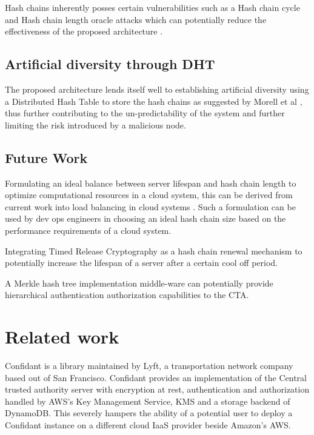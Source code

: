 \documentclass{sig-alternate-05-2015}
\begin{document}
Hash chains inherently posses certain vulnerabilities such as a Hash chain cycle and Hash chain length oracle attacks which can potentially reduce the effectiveness of the proposed architecture \cite{lee_hash_2007}. 

\subsection{Artificial diversity through DHT}

The proposed architecture lends itself well to establishing artificial diversity using a Distributed Hash Table to store the hash chains as suggested by Morell et al \cite{morrell_dht_2015}, thus further contributing to the un-predictability of the system and further limiting the risk introduced by a malicious node. 

\subsection{Future Work}
Formulating an ideal balance between server lifespan and hash chain length to optimize computational resources in a cloud system, this can be derived from current work into load balancing in cloud systems \cite{randles_comparative_2010}. Such a formulation can be used by dev ops engineers in choosing an ideal hash chain size based on the performance requirements of a cloud system.

Integrating Timed Release Cryptography \cite{chalkias_timed_2006} as a hash chain renewal mechanism to potentially increase the lifespan of a server after a certain cool off period.

A Merkle hash tree implementation middle-ware can potentially provide hierarchical authentication authorization \cite{yi_cloud_2012} capabilities to the CTA.

\section{Related work}

Confidant \cite{lyft_confidant:_2015} is a library maintained by Lyft, a transportation network company based out of San Francisco. Confidant provides an implementation of the Central trusted authority server with encryption at rest, authentication and authorization handled by AWS's Key Management Service, KMS and a storage backend of DynamoDB. This severely hampers the ability of a potential user to deploy a Confidant instance on a different cloud IaaS provider beside Amazon's AWS. 
\end{document}
